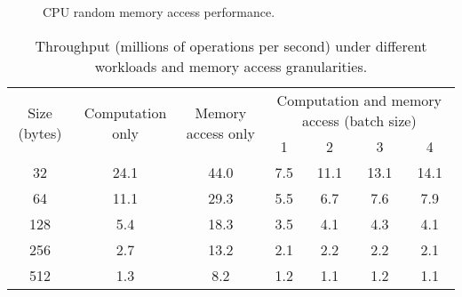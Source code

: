 {{\begin{figure}[htbp]
	\centering
	\caption{CPU random memory access performance.}
	\label{kvdirect:fig:cpu-mem}
\end{figure}


\begin{table}[htbp]
	\small
	\centering
	\caption{Throughput (millions of operations per second) under different workloads and memory access granularities.}
	\begin{tabular}{|c|c|c|c|c|c|c|}
		\hline
		\multirow{2}{*}{Size (bytes)} & \multirow{2}{*}{Computation only} & \multirow{2}{*}{Memory access only} & \multicolumn{4}{c|}{Computation and memory access (batch size)} \\\cline{4-7} 
		&  & & 1 & 2 & 3 & 4 \\\hline
		32 & 24.1 & 44.0 & 7.5 & 11.1 & 13.1 & 14.1 \\\hline
		64 & 11.1 & 29.3 & 5.5 & 6.7 & 7.6 & 7.9 \\\hline
		128 & 5.4 & 18.3 & 3.5 & 4.1 & 4.3 & 4.1 \\\hline
		256 & 2.7 & 13.2 & 2.1 & 2.2 & 2.2 & 2.1 \\\hline
		512 & 1.3 & 8.2 & 1.2 & 1.1 & 1.2 & 1.1 \\\hline
	\end{tabular}
	\label{kvdirect:tab:kv-cpu-throughput}
\end{table}


}}
